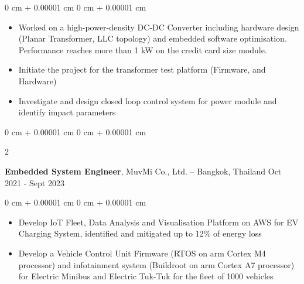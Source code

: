 \documentclass[10pt, a4paper]{article}
\newenvironment{highlights}{
    \begin{itemize}[
        topsep=0.10 cm,
        parsep=0.10 cm,
        partopsep=0pt,
        itemsep=0pt,
        leftmargin=0 cm + 10pt
    ]
}{
    \end{itemize}
} %
\newenvironment{onecolentry}{
    \begin{adjustwidth}{
        0 cm + 0.00001 cm
    }{
        0 cm + 0.00001 cm
    }
}{
    \end{adjustwidth}
} %
\newenvironment{twocolentry}[2][]{
    \onecolentry
    \def\secondColumn{#2}
    \setcolumnwidth{\fill, 4.5 cm}
    \begin{paracol}{2}
}{
    \switchcolumn \raggedleft \secondColumn
    \end{paracol}
    \endonecolentry
} %
\begin{document}
\begin{onecolentry}
	\begin{highlights}
		\item Worked on a high-power-density DC-DC Converter including hardware design (Planar Transformer, LLC topology) and embedded software optimisation. Performance reaches more than 1 kW on the credit card size module.
		\item Initiate the project for the transformer test platform (Firmware, and Hardware)
		\item Investigate and design closed loop control system for power module and identify impact parameters

	\end{highlights}
\end{onecolentry}

\vspace{0.10 cm}

\begin{twocolentry}{
		Oct 2021 - Sept 2023
	}
	\textbf{Embedded System Engineer}, MuvMi Co., Ltd. -- Bangkok, Thailand\end{twocolentry}
\begin{onecolentry}
	\begin{highlights}
		\item Develop IoT Fleet, Data Analysis and Visualisation Platform on AWS for EV Charging System, identified and mitigated up to 12\% of energy loss
		\item Develop a Vehicle Control Unit Firmware (RTOS on arm Cortex M4 processor) and infotainment system (Buildroot on arm Cortex A7 processor) for Electric Minibus and Electric Tuk-Tuk for the fleet of 1000 vehicles

	\end{highlights}
\end{onecolentry}





\end{document}
